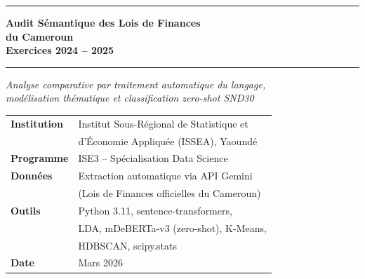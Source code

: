 \documentclass[12pt, a4paper]{article}
\begin{document}

\begin{titlepage}
\centering
\vspace*{1cm}

{\color{bleuCMR}\rule{\linewidth}{2pt}}
\vspace{0.4cm}

{\LARGE\bfseries\color{bleuCMR}
Audit Sémantique des Lois de Finances\\[0.3em]
du Cameroun\\[0.4em]
{\large\color{grisTexte} Exercices 2024 -- 2025}
}

\vspace{0.4cm}
{\color{bleuCMR}\rule{\linewidth}{2pt}}

\vspace{1.2cm}

{\large\textit{Analyse comparative par traitement automatique du langage,\\
modélisation thématique et classification zero-shot SND30}}

\vspace{1.5cm}

\begin{tabular}{ll}
\textbf{Institution} & Institut Sous-Régional de Statistique et\\
                     & d'Économie Appliquée (ISSEA), Yaoundé \\[4pt]
\textbf{Programme}   & ISE3 -- Spécialisation Data Science \\[4pt]
\textbf{Données}     & Extraction automatique via API Gemini \\[4pt]
                     & (Lois de Finances officielles du Cameroun) \\[4pt]
\textbf{Outils}      & Python 3.11, sentence-transformers,\\
                     & LDA, mDeBERTa-v3 (zero-shot), K-Means,\\
                     & HDBSCAN, scipy.stats \\[4pt]
\textbf{Date}        & Mars 2026 \\
\end{tabular}

\vfill


\end{titlepage}
\end{document}
